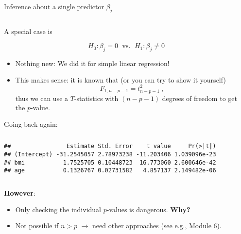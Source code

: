 \documentclass[10pt,ignorenonframetext,]{beamer}
\newenvironment{Shaded}{\begin{snugshade}}{\end{snugshade}}
\newcommand{\KeywordTok}[1]{\textcolor[rgb]{0.13,0.29,0.53}{\textbf{#1}}}
\newcommand{\NormalTok}[1]{#1}
\newcommand{\OperatorTok}[1]{\textcolor[rgb]{0.81,0.36,0.00}{\textbf{#1}}}
\begin{document}
\begin{frame}

\begin{block}{Inference about a single predictor \(\beta_j\)}

\(~\)

A special case is

\[H_0: \beta_j=0 \; \text{ vs. } \; H_1: \beta_j\neq 0\] \vspace{2mm}

\begin{itemize}
\item
  Nothing new: We did it for simple linear regression!
\item
  This makes sense: it is known that (or you can try to show it
  yourself) \[F_{1,n-p-1} = t^2_{n-p-1} \ ,\] thus we can use a
  \(T\)-statistics with \((n-p-1)\) degrees of freedom to get the
  \(p\)-value.
\end{itemize}

\end{block}

\end{frame}

\begin{frame}[fragile]

Going back again:

\(~\)

\footnotesize

\begin{Shaded}
\end{Shaded}

\begin{verbatim}
##                Estimate Std. Error    t value     Pr(>|t|)
## (Intercept) -31.2545057 2.78973238 -11.203406 1.039096e-23
## bmi           1.7525705 0.10448723  16.773060 2.600646e-42
## age           0.1326767 0.02731582   4.857137 2.149482e-06
\end{verbatim}

\normalsize

\(~\)

\textbf{However}:

\begin{itemize}
\item
  Only checking the individual \(p\)-values is dangerous.
  \textbf{Why?}\\
\item
  Not possible if \(n>p\) \(\rightarrow\) need other approaches (see
  e.g., Module 6).
\end{itemize}

\end{frame}
\end{document}
